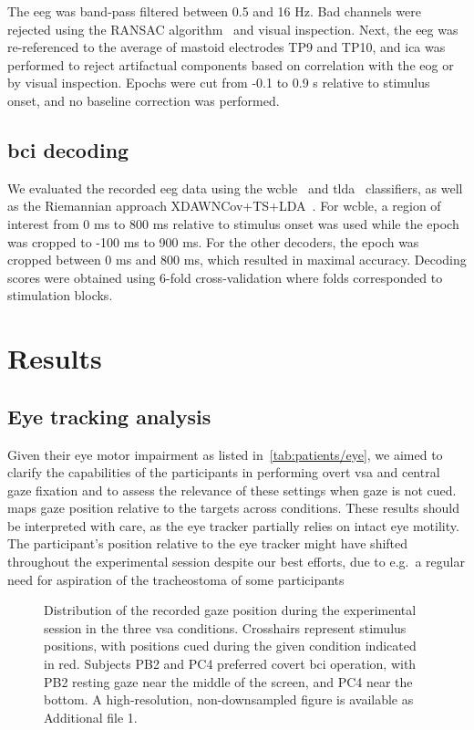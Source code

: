 \documentclass{article}
\begin{document}
The \ac{eeg} was band-pass filtered between 0.5 and 16 Hz.
Bad channels were rejected using the RANSAC algorithm~\cite{Fischler1981}
and visual inspection.
Next, the \ac{eeg} was re-referenced to the average of mastoid electrodes TP9
and TP10, and \ac{ica} was performed to reject artifactual components based on
correlation with the \ac{eog} or by visual inspection.
Epochs were cut from -0.1 to 0.9 s relative to stimulus onset, and no baseline
correction was performed.

\subsection{\Acs{bci} decoding}

We evaluated the recorded \ac{eeg} data using the \ac{wcble}~\cite{VanDenKerchove2024}
and \ac{tlda}~\cite{Sosulski2022}
classifiers, as well as the Riemannian approach XDAWNCov+TS+LDA~\cite{Cecotti2017}.
For \ac{wcble}, a region of interest from 0 ms to 800 ms relative to stimulus
onset was used while the epoch was cropped to -100 ms to 900 ms. For the other
decoders, the epoch was cropped between 0 ms and 800 ms, which resulted in maximal
accuracy.
Decoding scores were obtained using 6-fold cross-validation where folds corresponded to
stimulation blocks.

\section{Results}



\subsection{Eye tracking analysis}%
\label{sec:patients/outcomes/gaze}
Given their eye motor impairment as listed in~\cref{tab:patients/eye}, we aimed to clarify the
capabilities of the participants in performing overt \ac{vsa} and central gaze fixation and to
assess the relevance of these settings when gaze is not cued.
 maps gaze position relative to the targets
across conditions.
These results should be interpreted with care, as the eye tracker partially
relies on intact eye motility.
The participant's position relative to the eye tracker might have shifted
throughout the experimental session despite our best efforts, due to e.g.\ a
regular need for aspiration of the tracheostoma of some participants
\begin{figure}
	\caption{%
		Distribution of the recorded gaze position during the experimental session in the three \ac{vsa}
		conditions.
		Crosshairs represent stimulus positions, with positions cued during
		the given condition indicated in red.
		Subjects PB2 and PC4 preferred covert \ac{bci} operation, with PB2 resting gaze
		near the middle of the screen, and PC4 near the bottom.
		A high-resolution, non-downsampled figure is available as Additional file 1.
	}%
	\label{fig:patients/gaze}
\end{figure}
\end{document}
